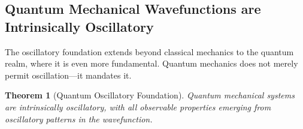 \documentclass[12pt,a4paper]{article}
\newtheorem{theorem}{Theorem}[section]
\theoremstyle{definition}
\theoremstyle{remark}
\begin{document}
\subsection{Quantum Mechanical Wavefunctions are Intrinsically Oscillatory}

The oscillatory foundation extends beyond classical mechanics to the quantum realm, where it is even more fundamental. Quantum mechanics does not merely permit oscillation—it mandates it.

\begin{theorem}[Quantum Oscillatory Foundation]
\label{thm:quantum_oscillation}
Quantum mechanical systems are intrinsically oscillatory, with all observable properties emerging from oscillatory patterns in the wavefunction.
\end{theorem}
\end{document}

